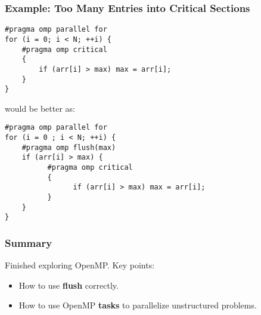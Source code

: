 \begin{frame}[fragile]
  \frametitle{Example: Too Many Entries into Critical Sections}

  
  \begin{lstlisting}
#pragma omp parallel for
for (i = 0; i < N; ++i) { 
    #pragma omp critical
    {
        if (arr[i] > max) max = arr[i];
    } 
}
  \end{lstlisting}

would be better as:

  \begin{lstlisting}
#pragma omp parallel for
for (i = 0 ; i < N; ++i) { 
    #pragma omp flush(max)
    if (arr[i] > max) {
          #pragma omp critical
          {
                if (arr[i] > max) max = arr[i];
          }
    }
}
  \end{lstlisting}
  
\end{frame}

\begin{frame}
  \frametitle{Summary}

  
    Finished exploring OpenMP. Key points:
  \begin{itemize}
    \item How to use {\bf flush} correctly.
    \item How to use OpenMP {\bf tasks} to parallelize unstructured problems.
  \end{itemize}
  
\end{frame}




